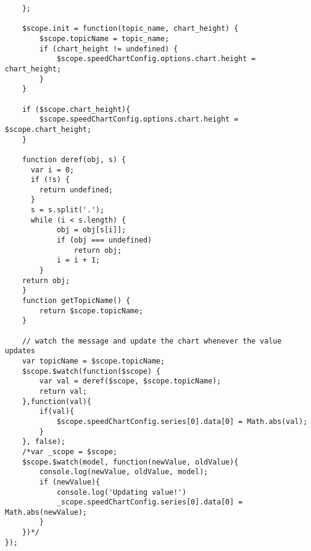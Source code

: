 \begin{verbatim}
    };

    $scope.init = function(topic_name, chart_height) {
        $scope.topicName = topic_name;
        if (chart_height != undefined) {
            $scope.speedChartConfig.options.chart.height = chart_height;
        }
    }

    if ($scope.chart_height){
        $scope.speedChartConfig.options.chart.height = $scope.chart_height;
    }

    function deref(obj, s) {
      var i = 0;
      if (!s) {
        return undefined;
      }
      s = s.split('.');
      while (i < s.length) {
            obj = obj[s[i]];
            if (obj === undefined)
                return obj;
            i = i + 1;
        }
    return obj;
    }
    function getTopicName() {
        return $scope.topicName;
    }

    // watch the message and update the chart whenever the value updates
    var topicName = $scope.topicName;
    $scope.$watch(function($scope) {
        var val = deref($scope, $scope.topicName);
        return val;
    },function(val){
        if(val){
            $scope.speedChartConfig.series[0].data[0] = Math.abs(val);
        }
    }, false);
    /*var _scope = $scope;
    $scope.$watch(model, function(newValue, oldValue){
        console.log(newValue, oldValue, model);
        if (newValue){
            console.log('Updating value!')
            _scope.speedChartConfig.series[0].data[0] = Math.abs(newValue);
        }
    })*/
});

\end{verbatim}


